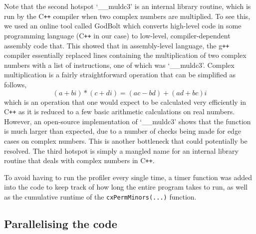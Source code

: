 \documentclass[11pt]{article}
\theoremstyle{theorem}
\theoremstyle{remark}
\theoremstyle{plain}
\theoremstyle{definition}
\begin{document}
Note that the second hotspot `\_\_muldc3' is an internal library routine, which is run by the C\texttt{++} compiler when two complex numbers are multiplied. To see this, we used an online tool called GodBolt \cite{god-bolt} which converts high-level code in some programming language (C\texttt{++} in our case) to low-level, compiler-dependent assembly code that. This showed that in assembly-level language, the g\texttt{++} compiler essentially replaced lines containing the multiplication of two complex numbers with a list of instructions, one of which was `\_\_muldc3'. Complex multiplication is a fairly straightforward operation that can be simplified as follows,
\begin{equation}
(a + bi) * (c+di) = (ac - bd) + (ad + bc)i
\end{equation}
which is an operation that one would expect to be calculated very efficiently in C\texttt{++} as it is reduced to a few basic arithmetic calculations on real numbers. However, an open-source implementation of `\_\_muldc3' \cite{muldc3} shows that the function is much larger than expected, due to a number of checks being made for edge cases on complex numbers. This is another bottleneck that could potentially be resolved. The third hotspot is simply a mangled name for an internal library routine that deals with complex numbers in C\texttt{++}.

To avoid having to run the profiler every single time, a timer function was added into the code to keep track of how long the entire program takes to run, as well as the cumulative runtime of the \texttt{cxPermMinors(...)} function.

\subsection{Parallelising the code}
\end{document}
